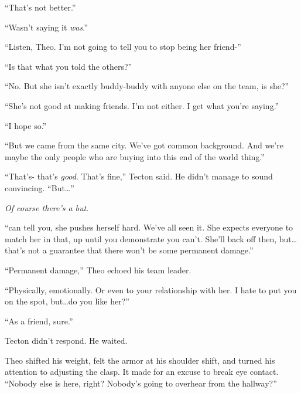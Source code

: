 ``That's not better.''



``Wasn't saying it \emph{was}.''



``Listen, Theo.  I'm not going to tell you to stop being her friend-''



``Is that what you told the others?''



``No.  But she isn't exactly buddy-buddy with anyone else on the team, is she?''



``She's not good at making friends.  I'm not either.  I get what you're saying.''



``I hope so.''



``But we came from the same city.  We've got common background.  And we're maybe the only people who are buying into this end of the world thing.''



``That's- that's \emph{good}.  That's fine,'' Tecton said.  He didn't manage to sound convincing.  ``But\ldots''



\emph{Of course there's a but}.



``\ldotsI can tell you, she pushes herself hard.  We've all seen it.  She expects everyone to match her in that, up until you demonstrate you can't.  She'll back off then, but\ldots that's not a guarantee that there won't be some permanent damage.''



``Permanent damage,'' Theo echoed his team leader.



``Physically, emotionally.  Or even to your relationship with her.  I hate to put you on the spot, but\ldots do you like her?''



``As a friend, sure.''



Tecton didn't respond.  He waited.



Theo shifted his weight, felt the armor at his shoulder shift, and turned his attention to adjusting the clasp.  It made for an excuse to break eye contact.  ``Nobody else is here, right?  Nobody's going to overhear from the hallway?''



